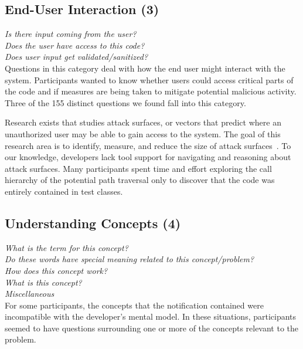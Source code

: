 \documentclass[conference]{IEEEtran}
\begin{document}
\noindent\subsection{\textbf{End-User Interaction (3)}}

\noindent\emph{Is there input coming from the user?} \\
\emph{Does the user have access to this code?} \\
\emph{Does user input get validated/sanitized?} \\

Questions in this category deal with how the end user might interact with the system. 
Participants wanted to know whether users could access critical parts of the code and if measures are being taken to mitigate potential malicious activity. 
Three of the 155 distinct questions we found fall into this category.

Research exists that studies attack surfaces, or vectors that predict where an unauthorized user may be able to gain access to the system. 
The goal of this research area is to identify, measure, and reduce the size of attack surfaces~\cite{manadhata2011attack, bartel2012automatically}. 
To our knowledge, developers lack tool support for navigating and reasoning about attack surfaces. 
Many participants spent time and effort exploring the call hierarchy of the potential path traversal only to discover that the code was entirely contained in test classes.
 

\noindent\subsection{\textbf{Understanding Concepts (4)}}

\noindent\emph{What is the term for this concept?} \\
\emph{Do these words have special meaning related to this concept/problem?} \\
\emph{How does this concept work?} \\
\emph{What is this concept?} \\
\emph{Miscellaneous} \\

For some participants, the concepts that the notification contained were incompatible with the developer's mental model. 
In these situations, participants seemed to have questions surrounding one or more of the concepts relevant to the problem.
\end{document}
